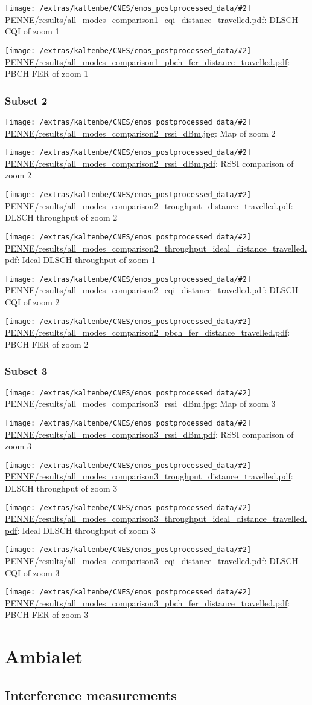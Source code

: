 \documentclass[a4paper,10pt]{article}
\newcommand{\printfile}[2][]{
 \begin{minipage}{8cm}
  \centering
  \texttt{[image: /extras/kaltenbe/CNES/emos\_postprocessed\_data/\#2]}
  \url{#2}: #1

 \end{minipage}
}
\begin{document}
\printfile[DLSCH CQI of zoom 1]{PENNE/results/all_modes_comparison1_cqi_distance_travelled.pdf}
\printfile[PBCH FER of zoom 1]{PENNE/results/all_modes_comparison1_pbch_fer_distance_travelled.pdf}

\subsubsection*{Subset 2}

\printfile[Map of zoom 2]{PENNE/results/all_modes_comparison2_rssi_dBm.jpg}
\printfile[RSSI comparison of zoom 2]{PENNE/results/all_modes_comparison2_rssi_dBm.pdf}

\printfile[DLSCH throughput of zoom 2]{PENNE/results/all_modes_comparison2_troughput_distance_travelled.pdf}
\printfile[Ideal DLSCH throughput of zoom 1]{PENNE/results/all_modes_comparison2_throughput_ideal_distance_travelled.pdf}

\printfile[DLSCH CQI of zoom 2]{PENNE/results/all_modes_comparison2_cqi_distance_travelled.pdf}
\printfile[PBCH FER of zoom 2]{PENNE/results/all_modes_comparison2_pbch_fer_distance_travelled.pdf}

\subsubsection*{Subset 3}

\printfile[Map of zoom 3]{PENNE/results/all_modes_comparison3_rssi_dBm.jpg}
\printfile[RSSI comparison of zoom 3]{PENNE/results/all_modes_comparison3_rssi_dBm.pdf}

\printfile[DLSCH throughput of zoom 3]{PENNE/results/all_modes_comparison3_troughput_distance_travelled.pdf}
\printfile[Ideal DLSCH throughput of zoom 3]{PENNE/results/all_modes_comparison3_throughput_ideal_distance_travelled.pdf}

\printfile[DLSCH CQI of zoom 3]{PENNE/results/all_modes_comparison3_cqi_distance_travelled.pdf}
\printfile[PBCH FER of zoom 3]{PENNE/results/all_modes_comparison3_pbch_fer_distance_travelled.pdf}


\section{Ambialet}
\label{sec:ambialet}

\subsection{Interference measurements}
\end{document}
